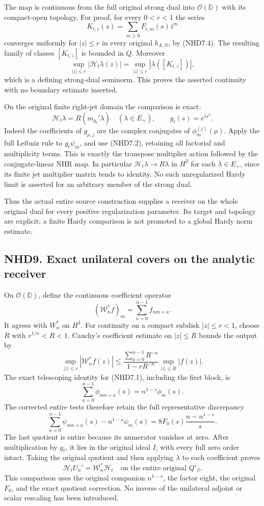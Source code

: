 The map is continuous from the full original strong dual into
\(\mathcal O(\mathbb D)\) with its compact-open topology. For proof, for
every \(0<r<1\) the series \[
K_{t,z}(s)=\sum_{m\ge0}F_{t,m}(s)\bar z^m
\tag{NHD8.2}
\] converges uniformly for \(|z|\le r\) in every original \(b_{A,N}\),
by (NHD7.4). The resulting family of classes \([K_{t,z}]\) is bounded in
\(Q\). Moreover \[
\sup_{|z|\le r}|\mathcal H_t\lambda(z)|
=\sup_{|z|\le r}|\lambda([K_{t,z}])|,
\tag{NHD8.3}
\] which is a defining strong-dual seminorm. This proves the asserted
continuity with no boundary estimate inserted.

On the original finite right-jet domain the comparison is exact: \[
\mathcal H_t\lambda=R(m_{g_t}'\lambda)
\quad(\lambda\in E_+),\qquad g_t(s)=e^{ts^2}.
\tag{NHD8.4}
\] Indeed the coefficients of \(g_{\rho,j}\) are the complex conjugates
of \(\phi_m^{(j)}(\rho)\). Apply the full Leibniz rule to \(g_t\psi_m\),
and use (NHD7.2), retaining all factorial and multiplicity terms. This
is exactly the transpose multiplier action followed by the
conjugate-linear NHR map. In particular
\(\mathcal H_t\lambda\to R\lambda\) in \(H^2\) for each
\(\lambda\in E_+\), since its finite jet multiplier matrix tends to
identity. No such unregularized Hardy limit is asserted for an arbitrary
member of the strong dual.

Thus the actual entire source construction supplies a receiver on the
whole original dual for every positive regularization parameter. Its
target and topology are explicit; a finite Hardy comparison is not
promoted to a global Hardy norm estimate.

\subsection{NHD9. Exact unilateral covers on the analytic
receiver}\label{nhd9.-exact-unilateral-covers-on-the-analytic-receiver}

On \(\mathcal O(\mathbb D)\), define the continuous coefficient operator
\[
(\mathscr W_n^*f)_m=\sum_{a=0}^{n-1}f_{nm+a}.
\tag{NHD9.1}
\] It agrees with \(W_n^*\) on \(H^2\). For continuity on a compact
subdisk \(|z|\le r<1\), choose \(R\) with \(r^{1/n}<R<1\). Cauchy's
coefficient estimate on \(|z|\le R\) bounds the output by \[
\sup_{|z|\le r}|\mathscr W_n^*f(z)|
\le\frac{\sum_{a=0}^{n-1}R^{-a}}{1-rR^{-n}}
\sup_{|z|\le R}|f(z)|.
\tag{NHD9.2}
\] The exact telescoping identity for (NHD7.1), including the first
block, is \[
\sum_{a=0}^{n-1}\phi_{nm+a}(s)=n^{1-s}\phi_m(s).
\tag{NHD9.3}
\] The corrected entire tests therefore retain the full representative
discrepancy \[
\sum_{a=0}^{n-1}\psi_{nm+a}(s)-n^{1-s}\psi_m(s)
=8F_0(s)\frac{n-n^{1-s}}s.
\tag{NHD9.4}
\] The last quotient is entire because its numerator vanishes at zero.
After multiplication by \(g_t\), it lies in the original ideal \(I\),
with every full zero order intact. Taking the original quotient and then
applying \(\lambda\) to each coefficient proves \[
\boxed{\mathcal H_tU_n'=\mathscr W_n^*\mathcal H_t
\quad\text{on the entire original }Q'_\beta.}
\tag{NHD9.5}
\] This comparison uses the original companion \(n^{1-s}\), the factor
eight, the original \(F_0\), and the exact quotient correction. No
inverse of the unilateral adjoint or scalar rescaling has been
introduced.

